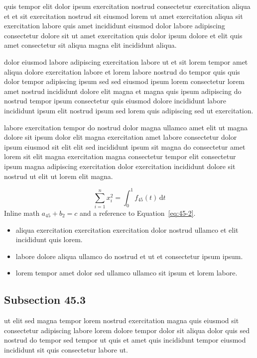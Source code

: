 \documentclass{article}
\begin{document}
quis tempor elit dolor ipsum exercitation nostrud consectetur exercitation aliqua et et sit exercitation nostrud sit eiusmod lorem ut amet exercitation aliqua sit exercitation labore quis amet incididunt eiusmod dolor labore adipiscing consectetur dolore sit ut amet exercitation quis dolor ipsum dolore et elit quis amet consectetur sit aliqua magna elit incididunt aliqua.

dolor eiusmod labore adipiscing exercitation labore ut et sit lorem tempor amet aliqua dolore exercitation labore et lorem labore nostrud do tempor quis quis dolor tempor adipiscing ipsum sed sed eiusmod ipsum lorem consectetur lorem amet nostrud incididunt dolore elit magna et magna quis ipsum adipiscing do nostrud tempor ipsum consectetur quis eiusmod dolore incididunt labore incididunt ipsum elit nostrud ipsum sed lorem quis adipiscing sed ut exercitation.

labore exercitation tempor do nostrud dolor magna ullamco amet elit ut magna dolore sit ipsum dolor elit magna exercitation amet labore consectetur dolor ipsum eiusmod sit elit elit sed incididunt ipsum sit magna do consectetur amet lorem sit elit magna exercitation magna consectetur tempor elit consectetur ipsum magna adipiscing exercitation dolor exercitation incididunt dolore sit nostrud ut elit ut lorem elit magna.

\begin{equation}\label{eq:45-2}
  \sum_{i=1}^{n} x_i^{2} = \int_0^1 f_{45}(t)\,\mathrm{d}t
\end{equation}
Inline math $a_{45} + b_{2} = c$ and a reference to Equation~\eqref{eq:45-2}.

\begin{itemize}
  \item aliqua exercitation exercitation exercitation dolor nostrud ullamco et elit incididunt quis lorem.
  \item labore dolore aliqua ullamco do nostrud et ut et consectetur ipsum ipsum.
  \item lorem tempor amet dolor sed ullamco ullamco sit ipsum et lorem labore.
\end{itemize}

\subsection{Subsection 45.3}\label{sec:45-3}
ut elit sed magna tempor lorem nostrud exercitation magna quis eiusmod sit consectetur adipiscing labore lorem dolore tempor dolor sit aliqua dolor quis sed nostrud do tempor sed tempor ut quis et amet quis incididunt tempor eiusmod incididunt sit quis consectetur labore ut.
\end{document}
